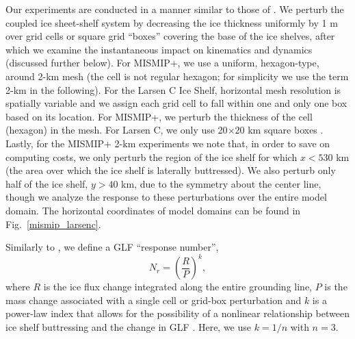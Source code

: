 \documentclass[tc, manuscript]{copernicus}
\begin{document}
Our experiments are conducted in a manner similar to those of \citet{reese2018}. We perturb the coupled ice sheet-shelf system by decreasing the ice thickness uniformly by 1 m over grid cells or square grid ``boxes'' covering the base of the ice shelves, after which we examine the instantaneous impact on kinematics and dynamics (discussed further below). For MISMIP+, we use a uniform, hexagon-type, around 2-km mesh (the cell is not regular hexagon; for simplicity we use the term 2-km in the following). For the Larsen C Ice Shelf, horizontal mesh resolution is spatially variable and we assign each grid cell to fall within one and only one box based on its location. For MISMIP+, we perturb the thickness of the cell (hexagon) in the mesh. For Larsen C, we only use 20$\times$20 km square boxes \citep[the same resolution as in][]{reese2018}. Lastly, for the MISMIP+ 2-km experiments we note that, in order to save on computing costs, we only perturb the region of the ice shelf for which $x<530$ km (the area over which the ice shelf is laterally buttressed).  We also perturb only half of the ice shelf, $y>40$ km, due to the symmetry about the center line, though we analyze the response to these perturbations over the entire model domain. The horizontal coordinates of model domains can be found in Fig.~\ref{mismip_larsenc}.

Similarly to \citet{reese2018}, we define a GLF ``response number'',
\begin{equation}
N_r = \left(\frac{R}{P}\right)^k,
\end{equation}
where $R$ is the ice flux change integrated along the entire grounding line, $P$ is the mass change associated with a single cell or grid-box perturbation and $k$ is a power-law index that allows for the possibility of a nonlinear relationship between ice shelf buttressing and the change in GLF \citep[see also][]{schoof2007}. Here, we use $k=1/n$ with $n=3$.
\end{document}
